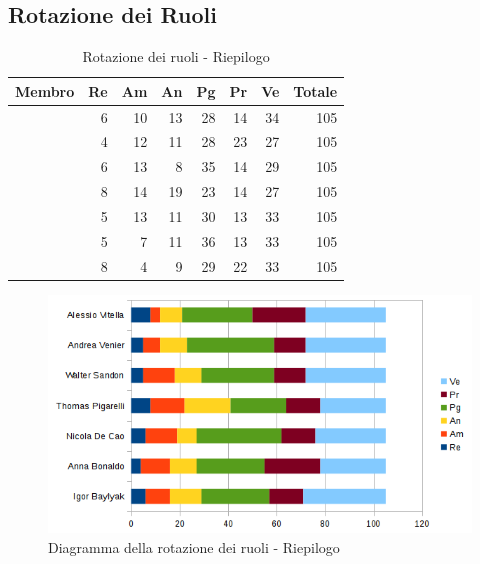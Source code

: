 \documentclass[12pt,a4paper]{article}
\begin{document}
\subsection{Rotazione dei Ruoli}

\begin{table}[H]
	\begin{center}
		\begin{tabular}{l r r r r r r r}
			\toprule
			\textbf{Membro}	&	\textbf{Re}	&	\textbf{Am}	& \textbf{An} & \textbf{Pg} & \textbf{Pr} & \textbf{Ve} & \textbf{Totale}\\
			\midrule
			\midrule
			\IB & 6 & 10 & 13 & 28 & 14 & 34 & 105 \\
			\midrule
			\AB & 4 & 12 & 11 & 28 & 23 & 27 & 105 \\
			\midrule
			\NDC & 6 & 13 & 8 & 35 & 14 & 29 & 105 \\
			\midrule
			\TP & 8 & 14 & 19 & 23 & 14 & 27 & 105 \\
			\midrule
			\WS & 5 & 13 & 11 & 30 & 13 & 33 & 105 \\
			\midrule
			\AVE & 5 & 7 & 11 & 36 & 13 & 33 & 105 \\
			\midrule
			\AVI & 8 & 4 & 9 & 29 & 22 & 33 & 105 \\
			\bottomrule
		\end{tabular}
		\caption{Rotazione dei ruoli - Riepilogo}
	\end{center}
\end{table}

\begin{center}
	\begin{figure}[H]
		\centering		\includegraphics[width=\textwidth]{diagrammaBarreRiepilogoRotazioneRuoli.png}
		\caption{Diagramma della rotazione dei ruoli - Riepilogo}
	\end{figure}
\end{center}
\end{document}

